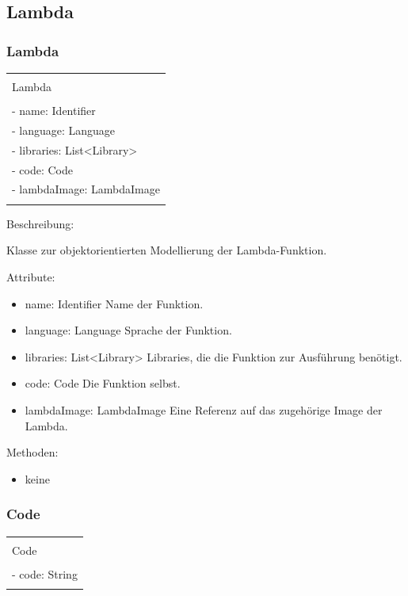 \documentclass[a4paper,20pt,oneside]{book}
\begin{document}
	
	\subsection{Lambda}
		\subsubsection{Lambda}
		\centering
	\begin{tabular}{|l|}
	\hline \\
	Lambda\\
	\hline \\
	- name: Identifier\\
    - language: Language\\
    - libraries: List<Library>\\
    - code: Code\\
    - lambdaImage: LambdaImage\\
    \hline \\
	\hline 
	\end{tabular}
	
	\raggedright
	\vspace{0.5cm}
	Beschreibung:
	
	Klasse zur objektorientierten Modellierung der Lambda-Funktion.
	
	\vspace{0.5cm}
	Attribute:
	\begin{itemize}
	\item name: Identifier \linebreak
	Name der Funktion.
    \item language: Language \linebreak
    Sprache der Funktion.
    \item libraries: List<Library> \linebreak
    Libraries, die die Funktion zur Ausführung benötigt.
    \item code: Code \linebreak
    Die Funktion selbst.
    \item lambdaImage: LambdaImage\linebreak
    Eine Referenz auf das zugehörige Image der Lambda.
    
	\end{itemize}
	
	Methoden:
	\begin{itemize}
	\item keine
	\end{itemize}
	
	\subsubsection{Code}
		\centering
	\begin{tabular}{|l|}
	\hline \\
	Code\\
	\hline \\
    - code: String\\
    \hline \\
	\hline 
	\end{tabular}
	
\end{document}
